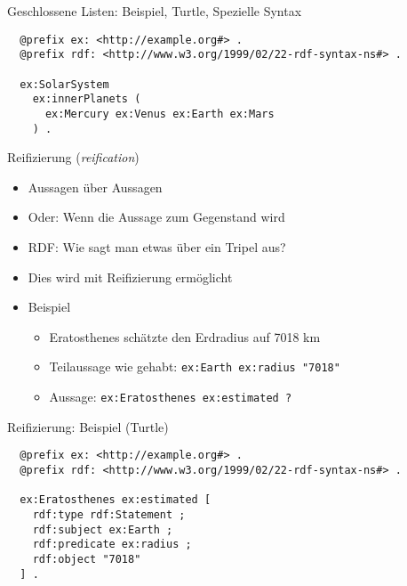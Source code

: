 \documentclass{beamer}
\begin{document}
\begin{frame}[fragile]{Geschlossene Listen: Beispiel, Turtle, Spezielle Syntax}
	
	\small
	\begin{lstlisting}	
  @prefix ex: <http://example.org#> .
  @prefix rdf: <http://www.w3.org/1999/02/22-rdf-syntax-ns#> .
	
  ex:SolarSystem
    ex:innerPlanets (
      ex:Mercury ex:Venus ex:Earth ex:Mars 
    ) .
	\end{lstlisting}
	
\end{frame}

\begin{frame}{Reifizierung (\emph{reification})}
	
	\begin{itemize}
		\item Aussagen über Aussagen
		\item Oder: Wenn die Aussage zum Gegenstand wird
		\item RDF: Wie sagt man etwas über ein Tripel aus?
		\item Dies wird mit Reifizierung ermöglicht
		\item Beispiel
		\begin{itemize}
			\item Eratosthenes schätzte den Erdradius auf 7018 km
			\item Teilaussage wie gehabt: \texttt{ex:Earth ex:radius "7018"}
			\item Aussage: \texttt{ex:Eratosthenes ex:estimated ?}
		\end{itemize}
	\end{itemize}
	
\end{frame}

\begin{frame}[fragile]{Reifizierung: Beispiel (Turtle)}
	
	\small
	\begin{lstlisting}	
  @prefix ex: <http://example.org#> .
  @prefix rdf: <http://www.w3.org/1999/02/22-rdf-syntax-ns#> .
		
  ex:Eratosthenes ex:estimated [
    rdf:type rdf:Statement ;
    rdf:subject ex:Earth ;
    rdf:predicate ex:radius ;
    rdf:object "7018"
  ] .
		\end{lstlisting}
	
\end{frame}
\end{document}
